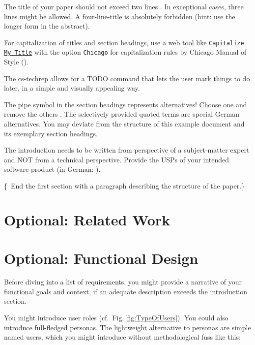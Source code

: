 \documentclass[conference,a4paper,flushend]{cs-techrep}
\begin{document}
The title of your paper should not exceed two lines \faWarning{}. In exceptional cases, three lines might be allowed. A four-line-title is absolutely forbidden (hint: use the longer form in the abstract).

For capitalization of titles and section headings, use a web tool like \href{https://capitalizemytitle.com/style/Chicago/}{\texttt{Capitalize My Title}} \faWarning{} with the option \texttt{Chicago} for capitalization rules by Chicago Manual of Style ().

The cs-techrep allows for a TODO command that lets the user mark things to do later, in a simple and visually appealing way.

The pipe symbol \textquote{\textbar{}} in the section headings represents alternatives! Choose one and remove the others \faWarning{}. The selectively provided quoted terms are special German alternatives. You may deviate from the structure of this example document and its exemplary section headings.

The introduction needs to be written from perspective of a subject-matter expert \faWarning{} and NOT from a technical perspective. Provide the USPs of your intended software product (in German: ).

\{\,\faWarning{} End the first section with a paragraph describing the structure of the paper.\}

\section{Optional: Related Work}
\lipsum[2]

\section{Optional: Functional Design}
Before diving into a list of requirements, you might provide a narrative of your functional goals and context, if an adequate description exceeds the introduction section.

You might introduce user roles \faWarning{} (cf.\ Fig.\,\ref{fig:TypeOfUsers}). You could also introduce full-fledged personas. The lightweight alternative to personas are simple named users, which you might introduce without methodological fuss like this: 
\end{document}
